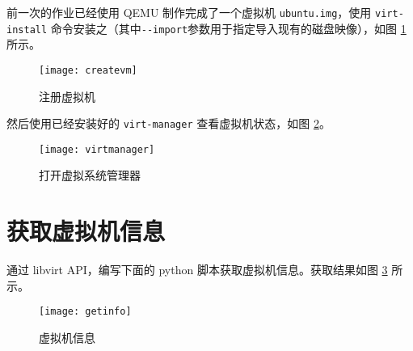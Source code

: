    前一次的作业已经使用 QEMU 制作完成了一个虚拟机 \verb"ubuntu.img"，使用 \verb"virt-install" 命令安装之（其中\verb"--import"参数用于指定导入现有的磁盘映像），如图 \ref{fig:createvm} 所示。


    \begin{figure}[H]
        \centering
        \texttt{[image: createvm]}
        \caption{注册虚拟机}\label{fig:createvm}
    \end{figure}

    然后使用已经安装好的 \verb"virt-manager" 查看虚拟机状态，如图 \ref{fig:virtmanager}。

    \begin{figure}[H]
        \centering
        \texttt{[image: virtmanager]}
        \caption{打开虚拟系统管理器}\label{fig:virtmanager}
    \end{figure}

    \section{获取虚拟机信息}

    通过 libvirt API\cite{libvirtapi}，编写下面的 python 脚本获取虚拟机信息。获取结果如图 \ref{fig:getinfo} 所示。


    \begin{figure}[H]
        \centering
        \texttt{[image: getinfo]}
        \caption{虚拟机信息}\label{fig:getinfo}
    \end{figure}

    
    
